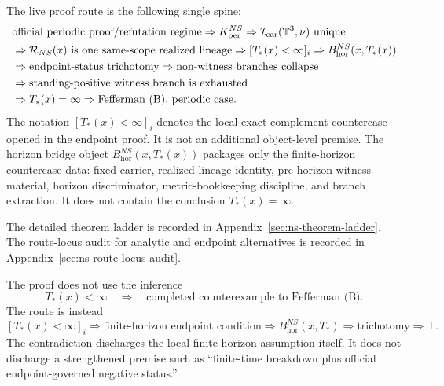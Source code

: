 \begin{tcolorbox}[breakable, title={Read this first: fixed-scope horizon proof spine}, colback=blue!2!white, colframe=blue!60!black]
The live proof route is the following single spine:
\[
\begin{aligned}
&\text{official periodic proof/refutation regime}
\Rightarrow K^{NS}_{\mathrm{per}}
\Rightarrow \mathcal I_{\mathrm{car}}(\mathbb{T}^3,\nu)\text{ unique} \\
&\Rightarrow \mathcal R_{NS}(x)\text{ is one same-scope realized lineage}
\Rightarrow [T_*(x)<\infty]_i
\Rightarrow B^{NS}_{\mathrm{hor}}(x,T_*(x)) \\
&\Rightarrow \text{endpoint-status trichotomy}
\Rightarrow \text{non-witness branches collapse} \\
&\Rightarrow \text{standing-positive witness branch is exhausted} \\
&\Rightarrow T_*(x)=\infty
\Rightarrow \text{Fefferman (B), periodic case.}
\end{aligned}
\]
The notation $[T_*(x)<\infty]_i$ denotes the local exact-complement countercase opened in the endpoint proof. It is not an additional object-level premise. The horizon bridge object $B^{NS}_{\mathrm{hor}}(x,T_*(x))$ packages only the finite-horizon countercase data: fixed carrier, realized-lineage identity, pre-horizon witness material, horizon discriminator, metric-bookkeeping discipline, and branch extraction. It does not contain the conclusion $T_*(x)=\infty$.

\medskip
The detailed theorem ladder is recorded in Appendix~\ref{sec:ns-theorem-ladder}. The route-locus audit for analytic and endpoint alternatives is recorded in Appendix~\ref{sec:ns-route-locus-audit}.
\end{tcolorbox}

\begin{tcolorbox}[breakable, title={No one-step counterexample promotion}, colback=cyan!1!white, colframe=cyan!45!black]
The proof does not use the inference
\[
T_*(x)<\infty\quad\Longrightarrow\quad\text{completed counterexample to Fefferman (B)}.
\]
The route is instead
\[
[T_*(x)<\infty]_i
\Rightarrow \text{finite-horizon endpoint condition}
\Rightarrow B^{NS}_{\mathrm{hor}}(x,T_*)
\Rightarrow \text{trichotomy}
\Rightarrow \bot.
\]
The contradiction discharges the local finite-horizon assumption itself. It does not discharge a strengthened premise such as ``finite-time breakdown plus official endpoint-governed negative status.''
\end{tcolorbox}

